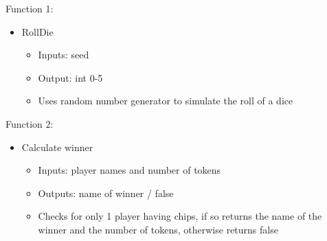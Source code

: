 \documentclass{article}
\begin{document}
Function 1:
\begin{itemize}
	\item RollDie
	\begin{itemize}
		\item Inputs: seed
		\item Output: int 0-5
		\item Uses random number generator to simulate the roll of a dice
	\end{itemize}
\end{itemize}
Function 2:
\begin{itemize}
	\item Calculate winner
	\begin{itemize}
		\item Inputs: player names and number of tokens
		\item Outputs: name of winner / false
		\item Checks for only 1 player having chips, if so returns the name of the winner and the number of tokens, otherwise returns false
	\end{itemize}
\end{itemize}
\end{document}
